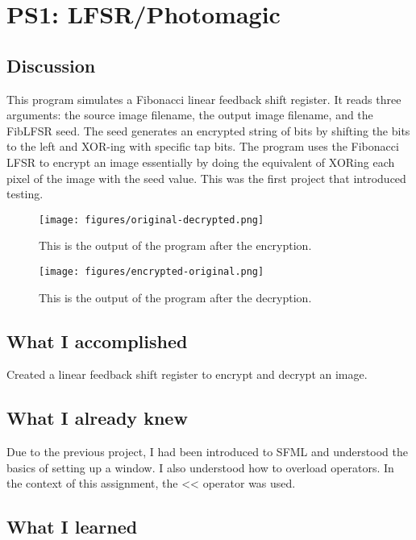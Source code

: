 \section{PS1: LFSR/Photomagic}\label{sec:ps1}

\subsection{Discussion}\label{sec:ps1:disc}

This program simulates a Fibonacci linear feedback shift register. It reads three arguments: the source image filename, the output image filename, and the FibLFSR seed. The seed generates an encrypted string of bits by shifting the bits to the left and XOR-ing with specific tap bits. The program uses the Fibonacci LFSR to encrypt an image essentially by doing the equivalent of XORing each pixel of the image with the seed value. This was the first project that introduced testing.

\begin{figure}[tbh]
	\centering
	\texttt{[image: figures/original-decrypted.png]}
	\caption{This is the output of the program after the encryption.}\label{fig:ori-dec}
\end{figure}

\begin{figure}[tbh]
	\centering
	\texttt{[image: figures/encrypted-original.png]}
	\caption{ This is the output of the program after the decryption.}\label{fig:en-ori}
\end{figure}


\subsection{What I accomplished}\label{sec:ps1:accomplish}

Created a linear feedback shift register to encrypt and decrypt an image.

\subsection{What I already knew}\label{sec:ps1:knew}
Due to the previous project, I had been introduced to SFML and understood the basics of setting up a window. I also understood how to overload operators. In the context of this assignment, the << operator was used.

\subsection{What I learned}\label{sec:ps1:learned}

